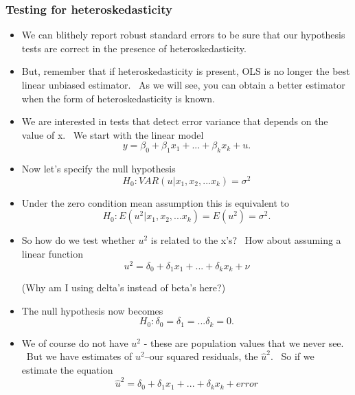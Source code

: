\documentclass[11pt]{article}
\begin{document}
\subsubsection{Testing for heteroskedasticity}

\begin{itemize}
\item We can blithely report robust standard errors to be sure that our
hypothesis tests are correct in the presence of heteroskedasticity. \ 

\item But, remember that if heteroskedasticity is present, OLS is no longer
the best linear unbiased estimator. \ As we will see, you can obtain a
better estimator when the form of heteroskedasticity is known.

\item We are interested in tests that detect error variance that depends on
the value of x. \ We start with the linear model%
\begin{equation*}
y=\beta _{0}+\beta _{1}x_{1}+...+\beta _{k}x_{k}+u.
\end{equation*}

\item Now let's specify the null hypothesis 
\begin{equation*}
H_{0}:VAR(u|x_{1},x_{2},...x_{k})=\sigma ^{2}
\end{equation*}

\item Under the zero condition mean assumption this is equivalent to%
\begin{equation*}
H_{0}:E(u^{2}|x_{1},x_{2},...x_{k})=E\left( u^{2}\right) =\sigma ^{2}.
\end{equation*}

\item So how do we test whether $u^{2}$ is related to the x's? \ How about
assuming a linear function%
\begin{equation*}
u^{2}=\delta _{0}+\delta _{1}x_{1}+...+\delta _{k}x_{k}+\nu
\end{equation*}

(Why am I using delta's instead of beta's here?)

\item The null hypothesis now becomes%
\begin{equation*}
H_{0}:\delta _{0}=\delta _{1}=...\delta _{k}=0.
\end{equation*}

\item We of course do not have $u^{2}$ - these are population values that we
never see. \ But we have estimates of $u^{2}$--our squared residuals, the $%
\widehat{u}^{2}.$ \ So if we estimate the equation%
\begin{equation*}
\widehat{u}^{2}=\delta _{0}+\delta _{1}x_{1}+...+\delta _{k}x_{k}+error
\end{equation*}


\end{itemize}
\end{document}
